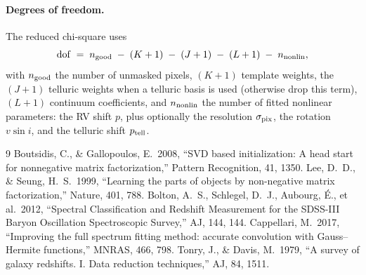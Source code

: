 \documentclass[11pt]{article}
\begin{document}
\paragraph{Degrees of freedom.}
The reduced chi-square uses
\begin{equation}
  \mathrm{dof} \;=\; n_{\rm good} \;-\; (K+1) \;-\; (J+1) \;-\; (L+1) \;-\; n_{\rm nonlin},
\end{equation}
with $n_{\rm good}$ the number of unmasked pixels, $(K+1)$ template weights, the
$(J+1)$ telluric weights when a telluric basis is used (otherwise drop this term),
$(L+1)$ continuum coefficients, and $n_{\rm nonlin}$ the number of fitted nonlinear
parameters: the RV shift $p$, plus optionally the resolution $\sigma_{\rm pix}$, the
rotation $v\sin i$, and the telluric shift $p_{\rm tell}$.

\begin{thebibliography}{9}
  Boutsidis, C., \& Gallopoulos, E.\ 2008,
  ``SVD based initialization: A head start for nonneg\-ative matrix factorization,''
  Pattern Recognition, 41, 1350.
  Lee, D.~D., \& Seung, H.~S.\ 1999,
  ``Learning the parts of objects by non-negative matrix factorization,''
  Nature, 401, 788.
  Bolton, A.~S., Schlegel, D.~J., Aubourg, \'E., et al.\ 2012,
  ``Spectral Classification and Redshift Measurement for the SDSS-III
  Baryon Oscillation Spectroscopic Survey,''
  AJ, 144, 144.
  Cappellari, M.\ 2017,
  ``Improving the full spectrum fitting method: accurate convolution with
  Gauss--Hermite functions,''
  MNRAS, 466, 798.
  Tonry, J., \& Davis, M.\ 1979,
  ``A survey of galaxy redshifts. I. Data reduction techniques,''
  AJ, 84, 1511.
\end{thebibliography}
\end{document}
